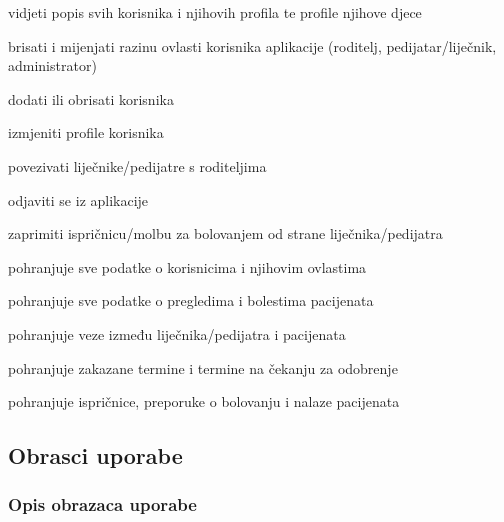 \begin{packed_enum}
				\item  {}
				\begin{packed_enum}
					\item vidjeti popis svih korisnika i njihovih profila te profile njihove djece
					\item brisati i mijenjati razinu ovlasti korisnika aplikacije (roditelj, pedijatar/liječnik, administrator)
					\item dodati ili obrisati korisnika
					\item izmjeniti profile korisnika
					\item povezivati liječnike/pedijatre s roditeljima
					\item odjaviti se iz aplikacije
				\end{packed_enum}
				
				\item  {}
				\begin{packed_enum}
					\item zaprimiti ispričnicu/molbu za bolovanjem od strane liječnika/pedijatra
				\end{packed_enum}
			
				\item  {}
				\begin{packed_enum}
				\item pohranjuje sve podatke o korisnicima i njihovim ovlastima
				\item pohranjuje sve podatke o pregledima i bolestima pacijenata
				\item pohranjuje veze između liječnika/pedijatra i pacijenata
				\item pohranjuje zakazane termine i termine na čekanju za odobrenje
				\item pohranjuje ispričnice, preporuke o bolovanju i nalaze pacijenata
				\end{packed_enum}
			\end{packed_enum}
			
			\eject 
			
			
				
			\subsection{Obrasci uporabe}
				
				\subsubsection{Opis obrazaca uporabe}
				
